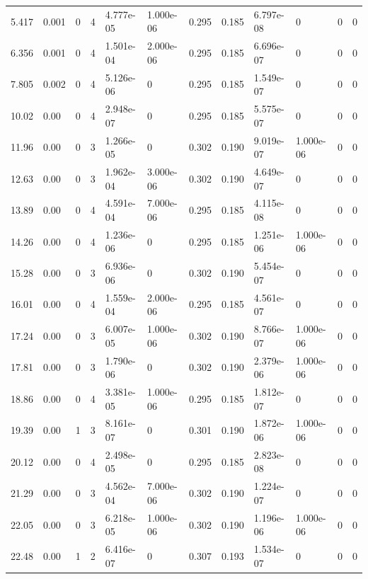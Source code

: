 \documentclass[preview]{standalone}
\begin{document}
{{\begin{tabular}{L{1.2cm}C{1.2cm} C{0.3cm}C{0.5cm} C{1.4cm}C{1.4cm} C{1.4cm}C{1.4cm} C{1.6cm}C{1.6cm} C{1.6cm}C{1.6cm}}
  5.417  &  0.001  & 0     &  4 &  4.777e-05  & 1.000e-06  &  0.295&   0.185& 6.797e-08 & 0   &  0 & 0  \\ 
  6.356  &  0.001  & 0     &  4 &  1.501e-04  & 2.000e-06  &  0.295&   0.185& 6.696e-07 & 0   &  0 & 0  \\ 
  7.805  &  0.002  & 0     &  4 &  5.126e-06  & 0  &  0.295&   0.185& 1.549e-07 & 0   &  0 & 0  \\ 
  10.02  &  0.00  & 0     &  4 &  2.948e-07  & 0  &  0.295&   0.185& 5.575e-07 & 0   &  0 & 0  \\ 
  11.96  &  0.00  & 0     &  3 &  1.266e-05  & 0  &  0.302&   0.190& 9.019e-07 & 1.000e-06   &  0 & 0  \\ 
  12.63  &  0.00  & 0     &  3 &  1.962e-04  & 3.000e-06  &  0.302&   0.190& 4.649e-07 & 0   &  0 & 0  \\ 
  13.89  &  0.00  & 0     &  4 &  4.591e-04  & 7.000e-06  &  0.295&   0.185& 4.115e-08 & 0   &  0 & 0  \\ 
  14.26  &  0.00  & 0     &  4 &  1.236e-06  & 0  &  0.295&   0.185& 1.251e-06 & 1.000e-06   &  0 & 0  \\ 
  15.28  &  0.00  & 0     &  3 &  6.936e-06  & 0  &  0.302&   0.190& 5.454e-07 & 0   &  0 & 0  \\ 
  16.01  &  0.00  & 0     &  4 &  1.559e-04  & 2.000e-06  &  0.295&   0.185& 4.561e-07 & 0   &  0 & 0  \\ 
  17.24  &  0.00  & 0     &  3 &  6.007e-05  & 1.000e-06  &  0.302&   0.190& 8.766e-07 & 1.000e-06   &  0 & 0  \\ 
  17.81  &  0.00  & 0     &  3 &  1.790e-06  & 0  &  0.302&   0.190& 2.379e-06 & 1.000e-06   &  0 & 0  \\ 
  18.86  &  0.00  & 0     &  4 &  3.381e-05  & 1.000e-06  &  0.295&   0.185& 1.812e-07 & 0   &  0 & 0  \\ 
  19.39  &  0.00  & 1     &  3 &  8.161e-07  & 0  &  0.301&   0.190& 1.872e-06 & 1.000e-06   &  0 & 0  \\ 
  20.12  &  0.00  & 0     &  4 &  2.498e-05  & 0  &  0.295&   0.185& 2.823e-08 & 0   &  0 & 0  \\ 
  21.29  &  0.00  & 0     &  3 &  4.562e-04  & 7.000e-06  &  0.302&   0.190& 1.224e-07 & 0   &  0 & 0  \\ 
  22.05  &  0.00  & 0     &  3 &  6.218e-05  & 1.000e-06  &  0.302&   0.190& 1.196e-06 & 1.000e-06   &  0 & 0  \\ 
  22.48  &  0.00  & 1     &  2 &  6.416e-07  & 0  &  0.307&   0.193& 1.534e-07 & 0   &  0 & 0  \\ 

\end{tabular}}}
\end{document}
